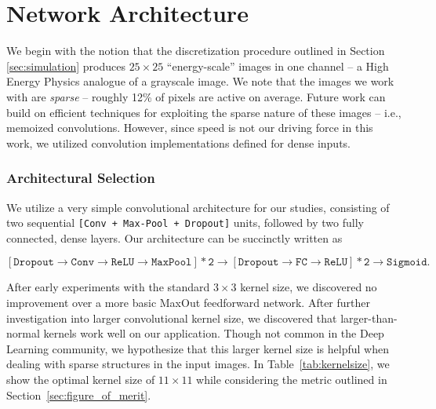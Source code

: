 
\section{Network Architecture}
\label{sec:arch}


We begin with the notion that the discretization procedure outlined in Section \ref{sec:simulation} produces $25\times 25$ ``energy-scale'' images in one channel -- a High Energy Physics analogue of a grayscale image. We note that the images we work with are \emph{sparse} -- roughly 12\% of pixels are active on average. Future work can build on efficient techniques for exploiting the sparse nature of these images -- i.e., memoized convolutions. However, since speed is not our driving force in this work, we utilized convolution implementations defined for dense inputs.

\subsubsection{Architectural Selection} %
\label{ssub:architectural_selection}
We utilize a very simple convolutional architecture for our studies, consisting of two sequential \texttt{[Conv + Max-Pool + Dropout]} units, followed by two fully connected, dense layers. Our architecture can be succinctly written as 

\begin{equation}
  \mathtt{[Dropout \rightarrow Conv \rightarrow ReLU \rightarrow MaxPool] * 2 \rightarrow [Dropout \rightarrow FC \rightarrow ReLU] * 2 \rightarrow Sigmoid}.
\end{equation}

After early experiments with the standard $3\times 3$ kernel size, we discovered no improvement over a more basic MaxOut \cite{maxout:goodfellow} feedforward network. After further investigation into larger convolutional kernel size, we discovered that larger-than-normal kernels work well on our application. Though not common in the Deep Learning community, we hypothesize that this larger kernel size is helpful when dealing with sparse structures in the input images. In Table~\ref{tab:kernelsize}, we show the optimal kernel size of $11\times11$ while considering the metric outlined in Section~\ref{sec:figure_of_merit}.


